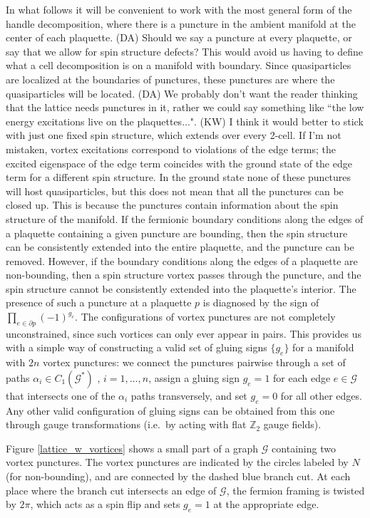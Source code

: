 \documentclass[12pt,a4paper]{article}
\newcommand{\mcg}{\mathcal{G}}
\newcommand{\zt}{\mathbb{Z}_2}
\newcommand{\p}{\partial}
\newcommand{\kw}[1]{{\color{kwcolor}\footnotesize{(KW) #1}}}
\newcommand{\dave}[1]{{\color{ao(english)}\footnotesize{(DA) #1}}}
\begin{document}
In what follows it will be convenient to work with the most general form of the handle decomposition, where there is a puncture in the ambient manifold at the center of each plaquette. 
\dave{Should we say a puncture at every plaquette, or say that we allow for spin structure defects? 
This would avoid us having to define what a cell decomposition is on a manifold with boundary.}
Since quasiparticles are localized at the boundaries of punctures, these punctures are where the quasiparticles will be located. 
\dave{We probably don't want the reader thinking that the lattice needs punctures in it, rather we could say something like ``the low energy excitations live on the plaquettes...". }
\kw{I think it would better to stick with just one fixed spin structure, which extends over every 2-cell.
If I'm not mistaken, vortex excitations correspond to violations of the edge terms;
the excited eigenspace of the edge term coincides with the ground 
state of the edge term for a different spin structure.}
In the ground state none of these punctures will host quasiparticles, but this does not mean that all the punctures can be closed up.
This is because the punctures contain information about the spin structure of the manifold.
If the fermionic boundary conditions along the edges of a plaquette containing a given puncture are bounding, then the spin structure can be consistently extended into the entire plaquette, and the puncture can be removed. 
However, if the boundary conditions along the edges of a plaquette are non-bounding, then a spin structure vortex passes through the puncture, and the spin structure cannot be consistently extended into the plaquette's interior.
The presence of such a puncture at a plaquette $p$ is diagnosed by the sign of $\prod_{e\in \p p}(-1)^{g_e}$. 
The configurations of vortex punctures are not completely unconstrained, since such vortices can only ever appear in pairs. 
This provides us with a simple way of constructing a valid set of gluing signs $\{g_e\}$ for a manifold with $2n$ vortex punctures: we connect the punctures pairwise through a set of paths $\alpha_i \in C_1(\mcg^*)$
, $i=1,\dots,n$,
assign a gluing sign $g_e=1$ for each edge $e \in \mcg$ that intersects one of the $\alpha_i$ paths transversely, and set $g_e=0$ for all other edges. 
Any other valid configuration of gluing signs can be obtained from this one through gauge transformations (i.e.\ by acting with flat $\zt$ gauge fields). 

Figure \ref{lattice_w_vortices} shows a small part of a graph $\mcg$ containing two vortex punctures. 
The vortex punctures are indicated by the circles labeled by $N$ (for non-bounding), and are connected by the dashed blue branch cut. 
At each place where the branch cut intersects an edge of $\mcg$, the fermion framing is twisted by $2\pi$, which acts as a spin flip and sets $g_e=1$ at the appropriate edge. 
\end{document}
